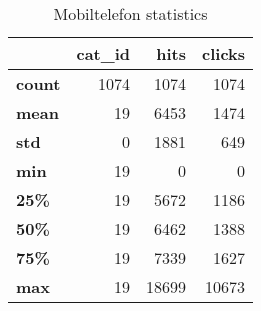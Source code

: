 \begin{table}[h]
\centering
\caption{Mobiltelefon statistics}
\label{table:Mobiltelefon_statistics}
\begin{tabular}{lrrr}
\toprule
{} &  cat\_id &  hits &  clicks \\
\midrule
\textbf{count} &    1074 &  1074 &    1074 \\
\textbf{mean } &      19 &  6453 &    1474 \\
\textbf{std  } &       0 &  1881 &     649 \\
\textbf{min  } &      19 &     0 &       0 \\
\textbf{25\%  } &      19 &  5672 &    1186 \\
\textbf{50\%  } &      19 &  6462 &    1388 \\
\textbf{75\%  } &      19 &  7339 &    1627 \\
\textbf{max  } &      19 & 18699 &   10673 \\
\bottomrule
\end{tabular}
\end{table}
